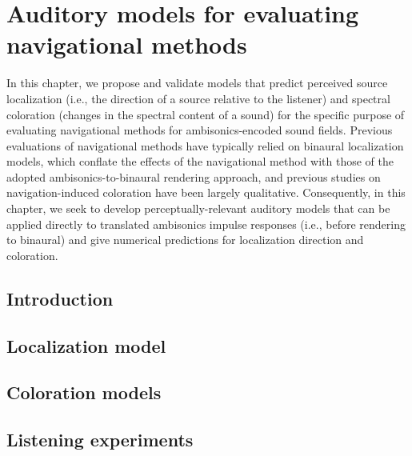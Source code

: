 \chapter{Auditory models for evaluating navigational methods}\label{chap:05_Proposed_Models}
In this chapter, we propose and validate models that predict perceived source localization (i.e., the direction of a source relative to the listener) and spectral coloration (changes in the spectral content of a sound) for the specific purpose of evaluating navigational methods for ambisonics-encoded sound fields.
Previous evaluations of navigational methods have typically relied on binaural localization models, which conflate the effects of the navigational method with those of the adopted ambisonics-to-binaural rendering approach, and previous studies on navigation-induced coloration have been largely qualitative.
Consequently, in this chapter, we seek to develop perceptually-relevant auditory models that can be applied directly to translated ambisonics impulse responses (i.e., before rendering to binaural) and give numerical predictions for localization direction and coloration.

\section{Introduction}\label{sec:05_Proposed_Models:Introduction}


\section{Localization model}\label{sec:05_Proposed_Models:Localization_Model}


\section{Coloration models}\label{sec:05_Proposed_Models:Coloration_Models}


\section{Listening experiments}\label{sec:05_Proposed_Models:Listening_Tests}


